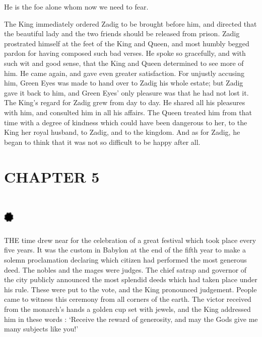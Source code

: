 \documentclass{article}
\begin{document}
\begin{center}
He is the foe alone whom now we need to fear. 

The King immediately ordered Zadig to be brought before him, and directed that 
the beautiful lady and the two friends should be released from prison. Zadig prostrated 
himself at the feet of the King and Queen, and most humbly begged pardon for having 
composed such bad verses. He spoke so gracefully, and with such wit and good sense, 
that the King and Queen determined to see more of him. He came again, and gave 
even greater satisfaction. For unjustly accusing him, Green Eyes was made to hand 
over to Zadig his whole estate; but Zadig gave it back to him, and Green Eyes' 
only pleasure was that he had not lost it. The King's regard for Zadig grew from 
day to day. He shared all his pleasures with him, and consulted him in all his 
affairs. The Queen treated him from that time with a degree of kindness which could 
have been dangerous to her, to the King her royal husband, to Zadig, and to the 
kingdom. And as for Zadig, he began to think that it was not so difficult to be 
happy after all.\pagebreak{} 

\section*{\textbf{CHAPTER 5 }}

\section*{%
\includegraphics[width=14pt, height=15pt, keepaspectratio=true]{Zadig or L'Ingenu - Voltaire-fig008.jpg}
}

 

THE time drew near for the celebration of a great festival which took place every 
five years. It was the custom in Babylon at the end of the fifth year to make a 
solemn proclamation declaring which citizen had performed the most generous deed. 
The nobles and the mages were judges. The chief satrap and governor of the city 
publicly announced the most splendid deeds which had taken place under his rule. 
These were put to the vote, and the King pronounced judgement. People came to witness 
this ceremony from all corners of the earth. The victor received from the monarch's 
hands a golden cup set with jewels, and the King addressed him in these words : 
`Receive the reward of generosity, and may the Gods give me many subjects like 
you!' 


\end{center}
\end{document}
